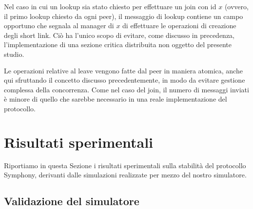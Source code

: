 \documentclass[prodmode,acmtap]{acmlarge}
\begin{document}

Nel caso in cui un lookup sia stato chiesto per effettuare un join con id $x$ (ovvero, il primo lookup chiesto da ogni peer), il messaggio di lookup contiene un campo opportuno che segnala al manager di $x$ di effettuare le operazioni di creazione degli short link. Ciò ha l'unico scopo di evitare, come discusso in precedenza, l'implementazione di una sezione critica distribuita non oggetto del presente studio.

Le operazioni relative al leave vengono fatte dal peer in maniera atomica, anche qui sfruttando il concetto discusso precedentemente, in modo da evitare gestione complessa della concorrenza. Come nel caso del join, il numero di messaggi inviati è minore di quello che sarebbe necessario in una reale implementazione del protocollo.









\section{Risultati sperimentali} \label{risultati}
Riportiamo in questa Sezione i risultati sperimentali sulla stabilità del protocollo Symphony, derivanti dalle simulazioni realizzate per mezzo del nostro simulatore.

\subsection{Validazione del simulatore}
\end{document}
